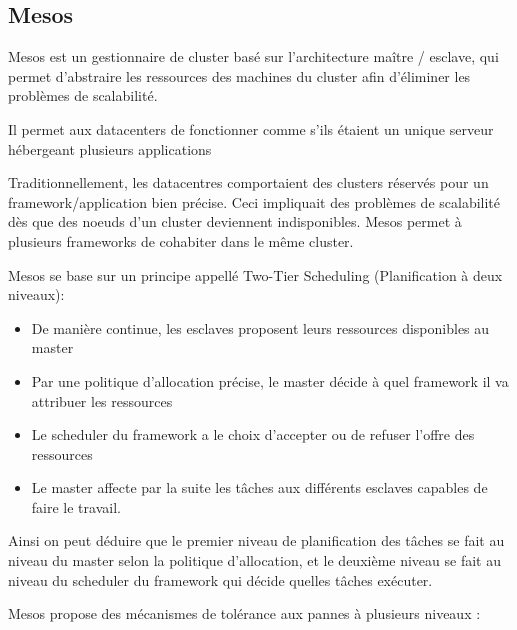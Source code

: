 \documentclass[a4paper, 11pt, titlepage]{article}
\begin{document}
\newpage
\subsection {Mesos}

Mesos est un gestionnaire de cluster basé sur l'architecture maître / esclave, qui permet d'abstraire les ressources des machines du cluster afin d'éliminer les problèmes de scalabilité.

Il permet aux datacenters de fonctionner comme s'ils étaient un unique serveur hébergeant plusieurs applications


Traditionnellement, les datacentres comportaient des clusters réservés pour un framework/application bien précise. Ceci impliquait des problèmes de scalabilité dès que des noeuds d'un cluster deviennent indisponibles. Mesos permet à plusieurs frameworks de cohabiter dans le même cluster.


Mesos se base sur un principe appellé Two-Tier Scheduling (Planification à deux niveaux):

\begin{itemize}

\item
De manière continue, les esclaves proposent leurs ressources disponibles au master

\item
Par une politique d'allocation précise, le master décide à quel framework il va attribuer les ressources

\item
Le scheduler du framework a le choix d'accepter ou de refuser l'offre des ressources

\item
Le master affecte par la suite les tâches aux différents esclaves capables de faire le travail.

\end{itemize}

Ainsi on peut déduire que le premier niveau de planification des tâches se fait au niveau du master selon la politique d'allocation, et le deuxième niveau se fait au niveau du scheduler du framework qui décide quelles tâches exécuter.


Mesos propose des mécanismes de tolérance aux pannes à plusieurs niveaux :
\end{document}
